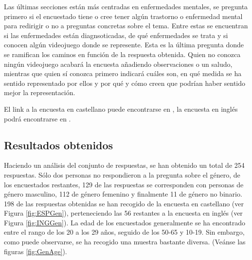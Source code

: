 \documentclass[12pt, a4paper,twoside,titlepage]{book}
\begin{document}
Las últimas secciones están más centradas en enfermedades mentales, se pregunta primero si el encuestado tiene o cree tener algún trastorno o enfermedad mental para redirigir o no a preguntas concretas sobre el tema. Entre estas se encuentran si las enfermedades están diagnsoticadas, de qué enfermedades se trata y si conocen algún videojuego donde se represente. Esta es la última pregunta donde se ramifican los caminos en función de la respuesta obtenida. Quien no conozca ningún videojuego acabará la encuesta añadiendo observaciones o un saludo, mientras que quien sí conozca primero indicará cuáles son, en qué medida se ha sentido representado por ellos y por qué y cómo creen que podrían haber sentido mejor la representación. 


El link a la encuesta en castellano puede encontrarse en , la encuesta en inglés podrá encontrarse en .

\subsection{Resultados obtenidos}


Haciendo un análisis del conjunto de respuestas, se han obtenido un total de 254 respuestas. Sólo dos personas no respondieron a la pregunta sobre el género, de los encuestados restantes, 129 de las respuestas se corresponden con personas de género masculino, 112 de género femenino y finalmente 11 de género no binario. 198 de las respuestas obtenidas se han recogido de la encuesta en castellano (ver Figura \ref{fig:ESPGen}), perteneciendo las 56 restantes a la encuesta en inglés (ver Figura \ref{fig:INGGen}). 
La edad de los encuestados generalmente se ha encontrado entre el rango de los 20 a los 29 años, seguido de los 50-65 y 10-19. Sin embargo, como puede observarse, se ha recogido una muestra bastante diversa. (Veánse las figuras \ref{fig:GenAge}). 
\end{document}
